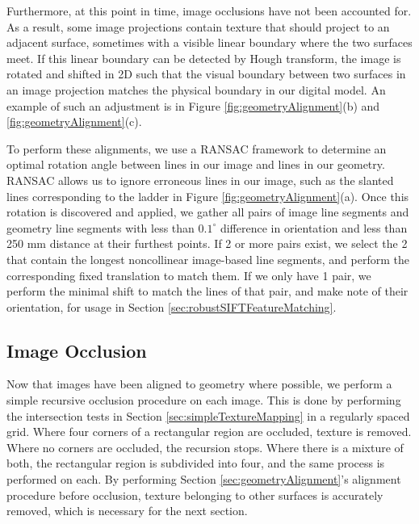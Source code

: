 \documentclass[]{spie}  %
\begin{document}
Furthermore, at this point in time, image occlusions have not been
accounted for. As a result, some image projections contain texture
that should project to an adjacent surface, sometimes with a visible
linear boundary where the two surfaces meet. If this linear boundary
can be detected by Hough transform, the image is rotated and shifted
in 2D such that the visual boundary between two surfaces in an image
projection matches the physical boundary in our digital model. An
example of such an adjustment is in Figure
\ref{fig:geometryAlignment}(b) and \ref{fig:geometryAlignment}(c).




To perform these alignments, we use a RANSAC \cite{fischler1981random}
framework to determine an optimal rotation angle between lines in our
image and lines in our geometry. RANSAC allows us to ignore erroneous
lines in our image, such as the slanted lines corresponding to the
ladder in Figure \ref{fig:geometryAlignment}(a). Once this rotation is
discovered and applied, we gather all pairs of image line segments and
geometry line segments with less than $0.1^\circ$ difference in
orientation and less than 250 mm distance at their furthest points. If
2 or more pairs exist, we select the 2 that contain the longest
noncollinear image-based line segments, and perform the corresponding
fixed translation to match them. If we only have 1 pair, we perform
the minimal shift to match the lines of that pair, and make note of
their orientation, for usage in Section
\ref{sec:robustSIFTFeatureMatching}.


\subsection{Image Occlusion}
\label{sec:imageOcclusion}
Now that images have been aligned to geometry where possible, we
perform a simple recursive occlusion procedure on each image. This is
done by performing the intersection tests in Section
\ref{sec:simpleTextureMapping} in a regularly spaced grid. Where four
corners of a rectangular region are occluded, texture is
removed. Where no corners are occluded, the recursion stops. Where
there is a mixture of both, the rectangular region is subdivided into
four, and the same process is performed on each. By performing Section
\ref{sec:geometryAlignment}'s alignment procedure before occlusion,
texture belonging to other surfaces is accurately removed, which is
necessary for the next section.
\end{document}
